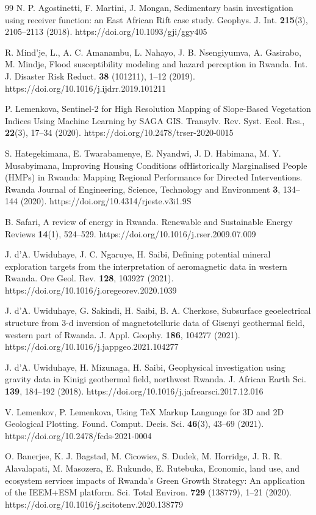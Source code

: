 \documentclass[myclassdoc,debug]{rjparticle}
\begin{document}
\begin{thebibliography}{99}
N. P. Agostinetti, F. Martini, J. Mongan, Sedimentary basin investigation using receiver function: an East African Rift case study. Geophys. J. Int. \textbf{215}(3), 2105--2113 (2018). https://doi.org/10.1093/gji/ggy405 

R. Mind'je, L., A.  C. Amanambu, L. Nahayo, J. B. Nsengiyumva, A. Gasirabo, M. Mindje, Flood susceptibility modeling and hazard perception in Rwanda. Int. J. Disaster Risk Reduct. \textbf{38} (101211), 1--12 (2019). https://doi.org/10.1016/j.ijdrr.2019.101211

P. Lemenkova, Sentinel-2 for High Resolution Mapping of Slope-Based Vegetation Indices Using Machine Learning by SAGA GIS. Transylv. Rev. Syst. Ecol. Res., \textbf{22}(3), 17--34 (2020). https://doi.org/10.2478/trser-2020-0015

S. Hategekimana, E. Twarabamenye, E. Nyandwi, J. D. Habimana, M. Y. Musabyimana, Improving Housing Conditions ofHistorically Marginalised People (HMPs) in Rwanda: Mapping Regional Performance for Directed Interventions. Rwanda Journal of Engineering, Science, Technology and Environment \textbf{3}, 134--144 (2020). https://doi.org/10.4314/rjeste.v3i1.9S

B. Safari, A review of energy in Rwanda. Renewable and Sustainable Energy Reviews \textbf{14}(1), 524--529. https://doi.org/10.1016/j.rser.2009.07.009 

J. d'A. Uwiduhaye, J. C. Ngaruye, H. Saibi, Defining potential mineral exploration targets from the interpretation of aeromagnetic data in western Rwanda. Ore Geol. Rev. \textbf{128}, 103927 (2021). https://doi.org/10.1016/j.oregeorev.2020.1039

J. d'A. Uwiduhaye, G. Sakindi, H. Saibi, B. A. Cherkose, Subsurface geoelectrical structure from 3-d inversion of magnetotelluric data of Gisenyi geothermal field, western part of Rwanda. J. Appl. Geophy. \textbf{186}, 104277 (2021). https://doi.org/10.1016/j.jappgeo.2021.104277 

J. d’A. Uwiduhaye, H. Mizunaga, H. Saibi, Geophysical investigation using gravity data in Kinigi geothermal field, northwest Rwanda. J. African Earth Sci. \textbf{139}, 184--192 (2018). https://doi.org/10.1016/j.jafrearsci.2017.12.016 

V. Lemenkov, P. Lemenkova, Using TeX Markup Language for 3D and 2D Geological Plotting. Found. Comput. Decis. Sci. \textbf{46}(3), 43--69 (2021). https://doi.org/10.2478/fcds-2021-0004

O. Banerjee, K. J. Bagstad, M. Cicowiez, S. Dudek, M. Horridge, J. R. R. Alavalapati, M. Masozera, E. Rukundo, E. Rutebuka, Economic, land use, and ecosystem services impacts of Rwanda's Green Growth Strategy: An application of the IEEM+ESM platform. Sci. Total Environ. \textbf{729} (138779), 1--21 (2020). https://doi.org/10.1016/j.scitotenv.2020.138779

\end{thebibliography}
\end{document}
